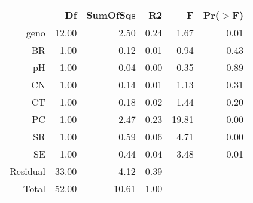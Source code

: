 \begin{table}[ht]
\centering
\begin{tabular}{rrrrrr}
  \hline
 & Df & SumOfSqs & R2 & F & Pr($>$F) \\ 
  \hline
geno & 12.00 & 2.50 & 0.24 & 1.67 & 0.01 \\ 
  BR & 1.00 & 0.12 & 0.01 & 0.94 & 0.43 \\ 
  pH & 1.00 & 0.04 & 0.00 & 0.35 & 0.89 \\ 
  CN & 1.00 & 0.14 & 0.01 & 1.13 & 0.31 \\ 
  CT & 1.00 & 0.18 & 0.02 & 1.44 & 0.20 \\ 
  PC & 1.00 & 2.47 & 0.23 & 19.81 & 0.00 \\ 
  SR & 1.00 & 0.59 & 0.06 & 4.71 & 0.00 \\ 
  SE & 1.00 & 0.44 & 0.04 & 3.48 & 0.01 \\ 
  Residual & 33.00 & 4.12 & 0.39 &  &  \\ 
  Total & 52.00 & 10.61 & 1.00 &  &  \\ 
   \hline
\end{tabular}
\end{table}

